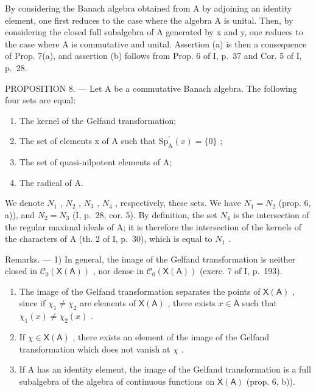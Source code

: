 By considering the Banach algebra obtained from A by adjoining an identity element, one first reduces to the case where the algebra A is unital. Then, by considering the closed full subalgebra of A generated by x and y, one reduces to the case where A is commutative and unital. Assertion (a) is then a consequence of Prop. 7(a), and assertion (b) follows from Prop. 6 of I, p.~37 and Cor. 5 of I, p.~28.

PROPOSITION 8. --- Let A be a commutative Banach algebra. The following four sets are equal:

\begin{enumerate}
\def\labelenumi{(\roman{enumi})}
\item
  The kernel of the Gelfand transformation;
\item
  The set of elements x of A such that \(\mathrm{Sp}_{\mathrm{A}}^{\prime}(x)=\{0\}\) ;
\item
  The set of quasi-nilpotent elements of A;
\item
  The radical of A.
\end{enumerate}

We denote \(N_{1}\) , \(N_{2}\) , \(N_{3}\) , \(N_{4}\) , respectively, these sets. We have \(N_{1} = N_{2}\) (prop. 6, a)), and \(N_{2} = N_{3}\) (I, p.~28, cor. 5). By definition, the set \(N_{4}\) is the intersection of the regular maximal ideals of A; it is therefore the intersection of the kernels of the characters of A (th. 2 of I, p.~30), which is equal to \(N_{1}\) .

Remarks. --- 1) In general, the image of the Gelfand transformation is neither closed in \(\mathcal{C}_{0}(\mathsf{X}(\mathsf{A}))\) , nor dense in \(\mathcal{C}_{0}(\mathsf{X}(\mathsf{A}))\) (exerc. 7 of I, p.~193).

\begin{enumerate}
\def\labelenumi{\arabic{enumi})}
\setcounter{enumi}{1}
\item
  The image of the Gelfand transformation separates the points of \(\mathsf{X}(\mathsf{A})\) , since if \(\chi_1 \neq \chi_2\) are elements of \(\mathsf{X}(\mathsf{A})\) , there exists \(x \in \mathsf{A}\) such that \(\chi_1(x) \neq \chi_2(x)\) .
\item
  If \(\chi \in \mathsf{X}(\mathsf{A})\) , there exists an element of the image of the Gelfand transformation which does not vanish at \(\chi\) .
\item
  If A has an identity element, the image of the Gelfand transformation is a full subalgebra of the algebra of continuous functions on \(\mathsf{X}(\mathsf{A})\) (prop. 6, b)).
\end{enumerate}

